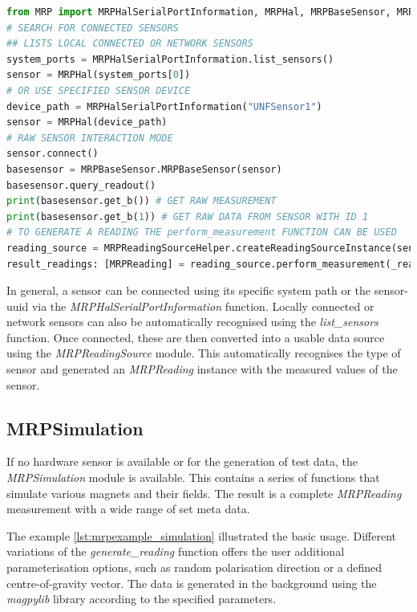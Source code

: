 \begin{lstlisting}[language=Python, caption={MRPHal example to use an connected hardware sensor to store readings inside of a measurement}, label=lst:mrpexample_hal]
from MRP import MRPHalSerialPortInformation, MRPHal, MRPBaseSensor, MRPReadingSource
# SEARCH FOR CONNECTED SENSORS
## LISTS LOCAL CONNECTED OR NETWORK SENSORS
system_ports = MRPHalSerialPortInformation.list_sensors()
sensor = MRPHal(system_ports[0])
# OR USE SPECIFIED SENSOR DEVICE
device_path = MRPHalSerialPortInformation("UNFSensor1")
sensor = MRPHal(device_path)
# RAW SENSOR INTERACTION MODE
sensor.connect()
basesensor = MRPBaseSensor.MRPBaseSensor(sensor)
basesensor.query_readout()
print(basesensor.get_b()) # GET RAW MEASUREMENT
print(basesensor.get_b(1)) # GET RAW DATA FROM SENSOR WITH ID 1
# TO GENERATE A READING THE perform_measurement FUNCTION CAN BE USED
reading_source = MRPReadingSourceHelper.createReadingSourceInstance(sensor)
result_readings: [MRPReading] = reading_source.perform_measurement(_readings=1, _hwavg=1)
\end{lstlisting}

In general, a sensor can be connected using its specific system path or
the sensor-\gls{uuid} via the \emph{MRPHalSerialPortInformation}
function. Locally connected or network sensors can also be automatically
recognised using the \emph{list\_sensors} function. Once connected,
these are then converted into a usable data source using the
\emph{MRPReadingSource} module. This automatically recognises the type
of sensor and generated an \emph{MRPReading} instance with the measured
values of the sensor.

\hypertarget{mrpsimulation}{%
\subsection{MRPSimulation}\label{mrpsimulation}}

If no hardware sensor is available or for the generation of test data,
the \emph{MRPSimulation} module is available. This contains a series of
functions that simulate various magnets and their fields. The result is
a complete \emph{MRPReading} measurement with a wide range of set meta
data.

The example \ref{lst:mrpexample_simulation} illustrated the basic usage.
Different variations of the \emph{generate\_reading} function offers the
user additional parameterisation options, such as random polarisation
direction or a defined centre-of-gravity vector. The data is generated
in the background using the \emph{magpylib}
\cite{ortner2020magpylib} library according to the specified
parameters.


